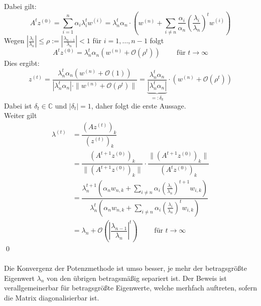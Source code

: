 \documentclass{article}
\begin{document}
    Dabei gilt:
    \[A^tz^{(0)} = \sum_{i=1}^{n}\alpha_i\lambda_i^tw^{(i)} = \lambda_n^t \alpha_n\cdot\left(w^{(n)} + 
    \sum_{i\neq n} \dfrac{\alpha_i}{\alpha_n}\left(\dfrac{\lambda_i}{\lambda_n}\right)^t w^{(i)}\right)\]
    Wegen $|\tfrac{\lambda_i}{\lambda_n}|\leq \rho:=|\tfrac{\lambda_{n-1}}{\lambda_n}|<1$ für $i=1,\dotsc,n-1$ folgt
    \[A^tz^{(0)} = \lambda_n^t\alpha_n(w^{(n)}+\mathcal{O}(\rho^t))
    \qquad \text{ für } t\rightarrow \infty\]
    Dies ergibt:
    \[z^{(t)} = \dfrac{\lambda_n^t\alpha_n(w^{(n)}+
    \mathcal{O}(1))}{|\lambda_n^t\alpha_n|\cdot\|w^{(n)}+\mathcal{O}(\rho^t)\|}
    = \underbrace{\dfrac{\lambda_n^t\alpha_n}{|\lambda_n^t\alpha_n|}}_{=:\delta_k}\cdot (w^{(n)}+\mathcal{O}(\rho^t))\]
    Dabei ist $\delta_t\in\mathbb{C}$ und $|\delta_t|=1$, daher folgt die erste Aussage.\\
    Weiter gilt 
    \begin{align*}
        \lambda^{(t)} &= \dfrac{(Az^{(t)})_k}{(z^{(t)})_k} \\
        &= \dfrac{(A^{t+1}z^{(0)})_k}{\|(A^{t+1}z^{(0)})_k\|}\cdot\dfrac{{\|(A^{t+1}z^{(0)})_k\|}}{(A^tz^{(0)})_k} \\
        &= \dfrac{\lambda_n^{t+1}(\alpha_n w_{n,k}+\sum_{i\neq n} \alpha_i(\tfrac{\lambda_i}{\lambda_n})^{t+1}w_{i,k})}
        {\lambda_n^t(\alpha_n w_{n,k}+\sum_{i\neq n} \alpha_i(\tfrac{\lambda_i}{\lambda_n})^tw_{i,k})} \\
        &= \lambda_n + \mathcal{O}\left(\left|\dfrac{\lambda_{n-1}}{\lambda_n}\right|^t\right)\qquad 
        \text{ für } t\rightarrow \infty
    \end{align*}
    \qed \\ \\
    Die Konvergenz der Potenzmethode ist umso besser, je mehr der betragsgrößte Eigenwert $\lambda_n$ von den übrigen 
    betragsmäßig separiert ist. Der Beweis ist verallgemeinerbar für betragsgrößte Eigenwerte, welche merhfach 
    auftreten, sofern die Matrix diagonalisierbar ist. \\ \\
\end{document}
